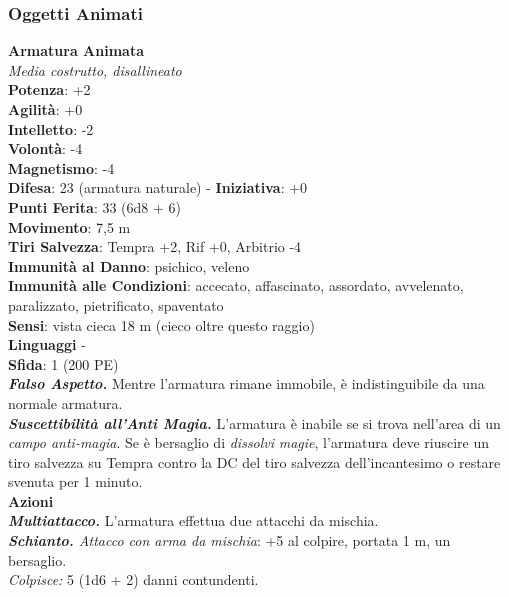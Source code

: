 \begin{multicols}{2}
\subsubsection{Oggetti Animati}

\medskip\textbf{Armatura Animata}\\
\emph{Media costrutto, disallineato}\\
\textbf{Potenza}: +2\\
\textbf{Agilità}: +0\\
\textbf{Intelletto}: -2\\
\textbf{Volontà}: -4\\
\textbf{Magnetismo}: -4\\
\textbf{Difesa}: 23 (armatura naturale) - \textbf{Iniziativa}: +0\\
\textbf{Punti Ferita}: 33 (6d8 + 6)\\
\textbf{Movimento}: 7,5 m\\
\textbf{Tiri Salvezza}: Tempra +2, Rif +0, Arbitrio -4\\
\textbf{Immunità al Danno}: psichico, veleno\\
\textbf{Immunità alle Condizioni}: accecato, affascinato, assordato, avvelenato, paralizzato, pietrificato, spaventato \\
\textbf{Sensi}: vista cieca 18 m (cieco oltre questo raggio)\\
\textbf{Linguaggi} -\\
\textbf{Sfida}: 1 (200 PE)\smallskip\\
\emph{\textbf{Falso Aspetto.}} Mentre l'armatura rimane immobile, è indistinguibile da una normale armatura.\\
\emph{\textbf{Suscettibilità all'Anti Magia.}} L'armatura è inabile se si trova nell'area di un \emph{campo anti-magia}. Se è bersaglio di \emph{dissolvi} \emph{magie}, l'armatura deve riuscire un tiro salvezza su Tempra contro la DC del tiro salvezza dell'incantesimo o restare svenuta per 1 minuto.\\
\smallskip\textbf{Azioni}\\
\emph{\textbf{Multiattacco.}} L'armatura effettua due attacchi da mischia.\\
\emph{\textbf{Schianto.} Attacco con arma da mischia}: +5 al colpire, portata 1 m, un bersaglio.\\
\emph{Colpisce:} 5 (1d6 + 2) danni contundenti.\\


\end{multicols}
